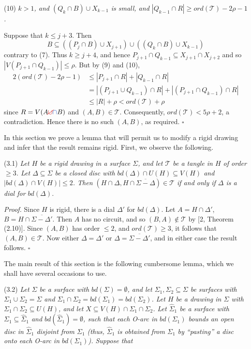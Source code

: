 \hspace*{12pt}(10) \textit{$k > 1$, and $(Q_k \cap B) \cup X_{k-1}$ is small, and $|Q_{k-1} \cap R| \ge ord(\mathscr{T}) - 2\rho - 1$.}

Suppose that $k \le j+3$. Then
\begin{equation*}
B \subseteq ((P_j \cap B) \cup X_{j+1}) \cup ((Q_k \cap B) \cup X_{k-1})
\end{equation*}
contrary to (7). Thus $k \ge j+4$, and hence $P_{j+1} \cap Q_{k-1} \subseteq X_{j+1} \cap X_{j+2}$ and so $|V(P_{j+1} \cap Q_{k-1})| \le \rho$. But by (9) and (10),
\begin{align*}
2(ord(\mathscr{T}) - 2\rho - 1) &\le |P_{j+1} \cap R| + |Q_{k-1} \cap R| \\
&= |(P_{j+1} \cup Q_{k-1}) \cap R| + |(P_{j+1} \cap Q_{k-1}) \cap R| \\
&\le |R| + \rho < ord(\mathscr{T}) + \rho
\end{align*}
since $R = V(A \delm{\cup}\fix{\cap} B)$ and $(A, B) \in \mathscr{T}$. Consequently, $ord(\mathscr{T}) < 5\rho+2$, a contradiction. Hence there is no such $(A, B)$, as required. $\square$


In this section we prove a lemma that will permit us to modify a rigid drawing and infer that the result remains rigid. First, we observe the following.

\stmt
(3.1) \textit{Let $H$ be a rigid drawing in a surface $\Sigma$, and let $\mathscr{T}$ be a tangle in $H$ of order $\ge 3$. Let $\Delta \subseteq \Sigma$ be a closed disc with $bd(\Delta) \cap U(H) \subseteq V(H)$ and $|bd(\Delta) \cap V(H)| \le 2$. Then $(H \cap \Delta, H \cap \overline{\Sigma - \Delta}) \in \mathscr{T}$ if and only if $\Delta$ is a dial for $bd(\Delta)$.}

\textit{Proof.} Since $H$ is rigid, there is a dial $\Delta'$ for $bd(\Delta)$. Let $A = H \cap \Delta'$, $B = H \cap \overline{\Sigma - \Delta'}$. Then $A$ has no circuit, and so $(B, A) \notin \mathscr{T}$ by [2, Theorem (2.10)]. Since $(A, B)$ has order $\le 2$, and $ord(\mathscr{T}) \ge 3$, it follows that $(A, B) \in \mathscr{T}$. Now either $\Delta = \Delta'$ or $\Delta = \overline{\Sigma - \Delta'}$, and in either case the result follows. $\square$

The main result of this section is the following cumbersome lemma, which we shall have several occasions to use.

\stmt
(3.2) \textit{Let $\Sigma$ be a surface with $bd(\Sigma) = \emptyset$, and let $\Sigma_1, \Sigma_2 \subseteq \Sigma$ be surfaces with $\Sigma_1 \cup \Sigma_2 = \Sigma$ and $\Sigma_1 \cap \Sigma_2 = bd(\Sigma_1) = bd(\Sigma_2)$. Let $H$ be a drawing in $\Sigma$ with $\Sigma_1 \cap \Sigma_2 \subseteq U(H)$, and let $X \subseteq V(H) \cap \Sigma_1 \cap \Sigma_2$. Let $\hat{\Sigma}_1$ be a surface with $\Sigma_1 \subseteq \hat{\Sigma}_1$ and $bd(\hat{\Sigma}_1) = \emptyset$, such that each O-arc in $bd(\Sigma_1)$ bounds an open disc in $\hat{\Sigma}_1$ disjoint from $\Sigma_1$ (thus, $\hat{\Sigma}_1$ is obtained from $\Sigma_1$ by ``pasting'' a disc onto each O-arc in $bd(\Sigma_1)$). Suppose that}
